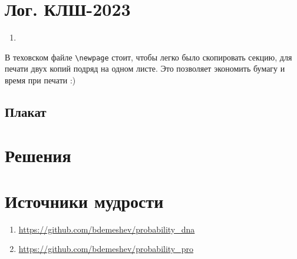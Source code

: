 \documentclass[12pt]{article}
\newcounter{problem}[section]
\theoremstyle{definition}
\begin{document}
\newpage
\dayone
\vfill
\dayone

\newpage
\daytwo
\vfill
\daytwo

\newpage
\daythree
\vfill
\daythree

\newpage
\dayfour
\vfill
\dayfour

\newpage
\dayfive
\vfill
\dayfive

\newpage
\daysix
\vfill
\daysix
\vfill
\daysix
\newpage


\section{Лог. КЛШ-2023}

\begin{enumerate}
  \item 
\end{enumerate}

В теховском файле \verb|\newpage| стоит, чтобы легко было скопировать секцию, для печати двух копий подряд на одном листе.
Это позволяет экономить бумагу и время при печати :)

\subsection{Плакат}






\renewenvironment{solution}[1]{%
         \vskip .5cm plus 2cm minus 0.1cm%
         {\bfseries \hyperlink{problem:#1}{#1.}}%
}%
{%
}%



\section{Решения}



\section{Источники мудрости}


\begin{enumerate}
\item \url{https://github.com/bdemeshev/probability_dna}
\item \url{https://github.com/bdemeshev/probability_pro}
\end{enumerate}

\printbibliography[heading=none]
\end{document}
